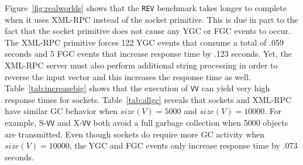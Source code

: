 \documentclass{sig-alternate}
\begin{document}


Figure~\ref{fig:realworlds} shows that the {\tt REV} benchmark takes
longer to complete when it uses XML-RPC instead of the socket
primitive.  This is due in part to the fact that the socket primitive
does not cause any YGC or FGC events to occur.  The XML-RPC primitive
forces 122 YGC events that consume a total of .059 seconds and 5 FGC
events that increase response time by .123 seconds.  Yet, the XML-RPC
server must also perform additional string processing in order to
reverse the input vector and this increases the response time as well.
Table~\ref{tab:increasebig} shows that the execution of {\tt VV} can
yield very high response times for sockets.  Table~\ref{tab:allgc}
reveals that sockets and XML-RPC have similar GC behavior when
$size(V)=5000$ and $size(V)=10000$.  For example, S-{\tt VV} and
X-{\tt VV} both avoid a full garbage collection when 5000 objects are
transmitted.  Even though sockets do require more GC activity when
$size(V)=10000$, the YGC and FGC events only increase response time by
.073 seconds.


\end{document}

